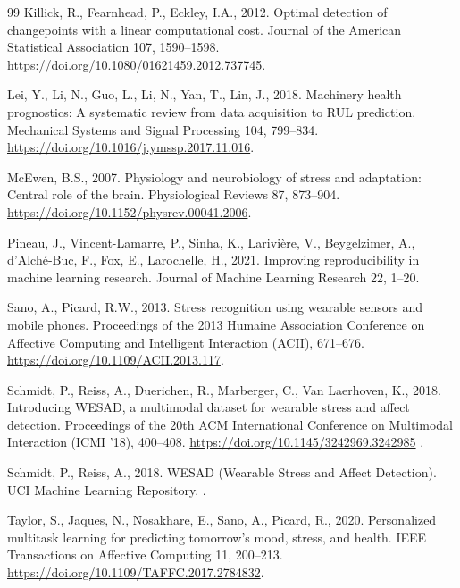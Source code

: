 \documentclass[preprint,12pt,authoryear]{elsarticle}
\providecommand{\DIFdeltex}[1]{{\protect\color{red} \scriptsize #1}} %
\providecommand{\DIFdelbegin}{} %
\providecommand{\DIFdelend}{} %
\providecommand{\DIFdel}[1]{\texorpdfstring{\DIFdeltex{#1}}{}} %
\newcommand{\DIFscaledelfig}{0.5}
\newlength{\DIFdelgraphicswidth} %
\newlength{\DIFdelgraphicsheight} %
\newcommand{\DIFdelincludegraphics}[2][]{%
\sbox{\DIFdelgraphicsbox}{\DIFOincludegraphics[#1]{#2}}%
\settoboxwidth{\DIFdelgraphicswidth}{\DIFdelgraphicsbox} %
\settoboxtotalheight{\DIFdelgraphicsheight}{\DIFdelgraphicsbox} %
\scalebox{\DIFscaledelfig}{%
\parbox[b]{\DIFdelgraphicswidth}{\usebox{\DIFdelgraphicsbox}\\[-\baselineskip] \rule{\DIFdelgraphicswidth}{0em}}\llap{\resizebox{\DIFdelgraphicswidth}{\DIFdelgraphicsheight}{%
\setlength{\unitlength}{\DIFdelgraphicswidth}%
\begin{picture}(1,1)%
\thicklines\linethickness{2pt} %
{\color[rgb]{1,0,0}\put(0,0){\framebox(1,1){}}}%
{\color[rgb]{1,0,0}\put(0,0){\line( 1,1){1}}}%
{\color[rgb]{1,0,0}\put(0,1){\line(1,-1){1}}}%
\end{picture}%
}\hspace*{3pt}}} %
} %
\DeclareRobustCommand{\DIFdelbegin}{\DIFOdelbegin \let\includegraphics\DIFdelincludegraphics} %
\DeclareRobustCommand{\DIFdelend}{\DIFOaddend \let\includegraphics\DIFOincludegraphics} %
\begin{document}
\begin{thebibliography}{99}
Killick, R., Fearnhead, P., Eckley, I.A., 2012.
Optimal detection of changepoints with a linear computational cost.
Journal of the American Statistical Association 107, 1590--1598.
\url{https://doi.org/10.1080/01621459.2012.737745}.

Lei, Y., Li, N., Guo, L., Li, N., Yan, T., Lin, J., 2018.
Machinery health prognostics: A systematic review from data acquisition
to RUL prediction.
Mechanical Systems and Signal Processing 104, 799--834.
\url{https://doi.org/10.1016/j.ymssp.2017.11.016}.

McEwen, B.S., 2007.
Physiology and neurobiology of stress and adaptation: Central role of
the brain.
Physiological Reviews 87, 873--904.
\url{https://doi.org/10.1152/physrev.00041.2006}.

Pineau, J., Vincent-Lamarre, P., Sinha, K., Larivi\`{e}re, V.,
Beygelzimer, A., d'Alch\'{e}-Buc, F., Fox, E., Larochelle, H., 2021.
Improving reproducibility in machine learning research.
Journal of Machine Learning Research 22, 1--20.

Sano, A., Picard, R.W., 2013.
Stress recognition using wearable sensors and mobile phones.
Proceedings of the 2013 Humaine Association Conference on Affective
Computing and Intelligent Interaction (ACII), 671--676.
\url{https://doi.org/10.1109/ACII.2013.117}.

Schmidt, P., Reiss, A., Duerichen, R., Marberger, C.,
Van Laerhoven, K., 2018.
Introducing WESAD, a multimodal dataset for wearable stress and affect
detection.
Proceedings of the 20th ACM International Conference on Multimodal
Interaction (ICMI '18), 400--408.
\url{https://doi.org/10.1145/3242969.3242985}\DIFdelbegin \DIFdel{.
}%

\DIFdel{Schmidt, P., Reiss, A., 2018.
WESAD (Wearable Stress and Affect Detection).
UCI Machine Learning Repository.
}%
\DIFdelend .

Taylor, S., Jaques, N., Nosakhare, E., Sano, A., Picard, R., 2020.
Personalized multitask learning for predicting tomorrow's mood, stress,
and health.
IEEE Transactions on Affective Computing 11, 200--213.
\url{https://doi.org/10.1109/TAFFC.2017.2784832}.


\end{thebibliography}
\end{document}
